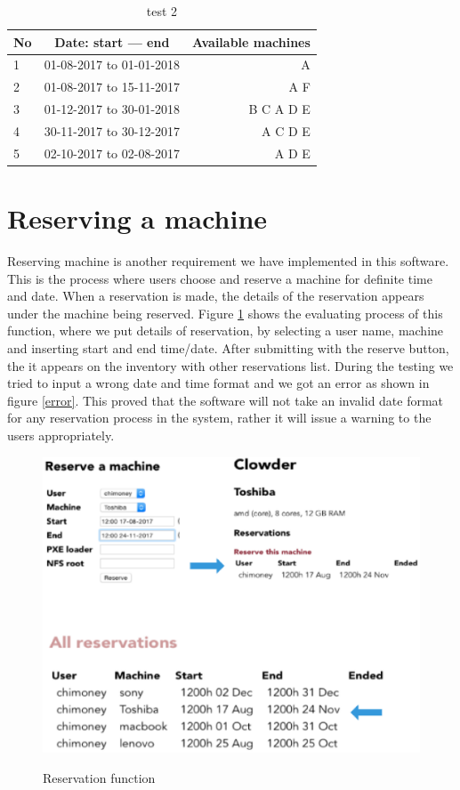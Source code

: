 \begin{table}[h!]
  \centering
  \label{tab:table1}
  \begin{tabular}{l|c||r}
    No & Date: start --- end & Available machines\\
    \hline
    1 &01-08-2017 to 01-01-2018  & A \\
    2 &01-08-2017 to 15-11-2017  & A F\\
    3 &01-12-2017 to 30-01-2018  & B C A D E \\
    4 &30-11-2017 to 30-12-2017  & A  C D E\\
    5 &02-10-2017 to 02-08-2017  & A  D E \\
  \end{tabular}
  \caption{test 2}
\end{table}


\pagebreak
\section*{Reserving a machine}
Reserving machine is another requirement we have implemented in this software. This is the process where users choose and reserve a machine for definite time and date. When a reservation is made, the details of the reservation appears under the machine being reserved. Figure \ref{reserve} shows the evaluating process of this function, where we put details of reservation, by selecting a user name, machine and inserting start and end time/date. After submitting with the reserve button, the it appears on the inventory with other reservations list. During the testing we tried to input a wrong date and time format and we got an error as shown in figure \ref{error}. This proved that the software will not take an invalid date format for any reservation process in the system, rather it will issue a warning to the users appropriately.

\begin{figure}[h]
  \includegraphics[width=\linewidth]{reserve.eps}
  \label{reserve}
  \caption{Reservation function}
  \end{figure}
  
